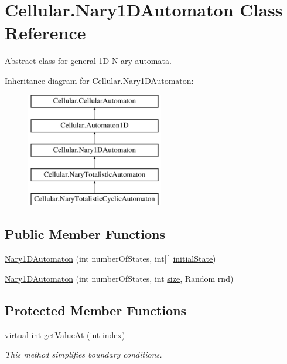 \hypertarget{class_cellular_1_1_nary1_d_automaton}{}\section{Cellular.\+Nary1\+D\+Automaton Class Reference}
\label{class_cellular_1_1_nary1_d_automaton}


Abstract class for general 1\+D N-\/ary automata.  


Inheritance diagram for Cellular.\+Nary1\+D\+Automaton\+:\begin{figure}[H]
\begin{center}
\leavevmode
\includegraphics[height=5.000000cm]{class_cellular_1_1_nary1_d_automaton}
\end{center}
\end{figure}
\subsection*{Public Member Functions}
\begin{DoxyCompactItemize}
\item 
\hyperlink{class_cellular_1_1_nary1_d_automaton_a9b38ab16780bc9fb347f714bdd8f1295}{Nary1\+D\+Automaton} (int number\+Of\+States, int\mbox{[}$\,$\mbox{]} \hyperlink{all__1_8js_ae8b87ff4be2ae1dd5267342795263360}{initial\+State})
\item 
\hyperlink{class_cellular_1_1_nary1_d_automaton_ad9678852ba9ef44a300f2d272757d482}{Nary1\+D\+Automaton} (int number\+Of\+States, int \hyperlink{class_cellular_1_1_automaton1_d_a915129ccf0f1e7092844c99ce6a28e5b}{size}, Random rnd)
\end{DoxyCompactItemize}
\subsection*{Protected Member Functions}
\begin{DoxyCompactItemize}
\item 
virtual int \hyperlink{class_cellular_1_1_nary1_d_automaton_adfd39915b66667efeeb9b16f154b9b6b}{get\+Value\+At} (int index)
\begin{DoxyCompactList}\small\item\em This method simplifies boundary conditions. \end{DoxyCompactList}\end{DoxyCompactItemize}
